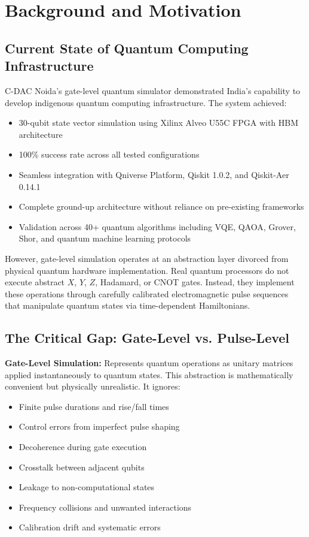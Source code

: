 \documentclass[12pt,a4paper]{article}
\begin{document}
\section{Background and Motivation}

\subsection{Current State of Quantum Computing Infrastructure}

C-DAC Noida's gate-level quantum simulator demonstrated India's capability to develop indigenous quantum computing infrastructure. The system achieved:

\begin{itemize}[noitemsep]
\item 30-qubit state vector simulation using Xilinx Alveo U55C FPGA with HBM architecture
\item 100\% success rate across all tested configurations
\item Seamless integration with Qniverse Platform, Qiskit 1.0.2, and Qiskit-Aer 0.14.1
\item Complete ground-up architecture without reliance on pre-existing frameworks
\item Validation across 40+ quantum algorithms including VQE, QAOA, Grover, Shor, and quantum machine learning protocols
\end{itemize}

However, gate-level simulation operates at an abstraction layer divorced from physical quantum hardware implementation. Real quantum processors do not execute abstract $X$, $Y$, $Z$, Hadamard, or CNOT gates. Instead, they implement these operations through carefully calibrated electromagnetic pulse sequences that manipulate quantum states via time-dependent Hamiltonians.

\subsection{The Critical Gap: Gate-Level vs. Pulse-Level}

\textbf{Gate-Level Simulation:} Represents quantum operations as unitary matrices applied instantaneously to quantum states. This abstraction is mathematically convenient but physically unrealistic. It ignores:

\begin{itemize}[noitemsep]
\item Finite pulse durations and rise/fall times
\item Control errors from imperfect pulse shaping
\item Decoherence during gate execution
\item Crosstalk between adjacent qubits
\item Leakage to non-computational states
\item Frequency collisions and unwanted interactions
\item Calibration drift and systematic errors
\end{itemize}
\end{document}

